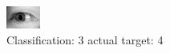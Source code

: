 \begin{figure}[h!]
\begin{center}
\includegraphics[width=0.60\columnwidth]{figures/ID3152_class_3_target_4.png}
\end{center}
\caption{ Classification: 3 actual target: 4}
\label{fig:ID3152_class_3_target_4}
\end{figure}
